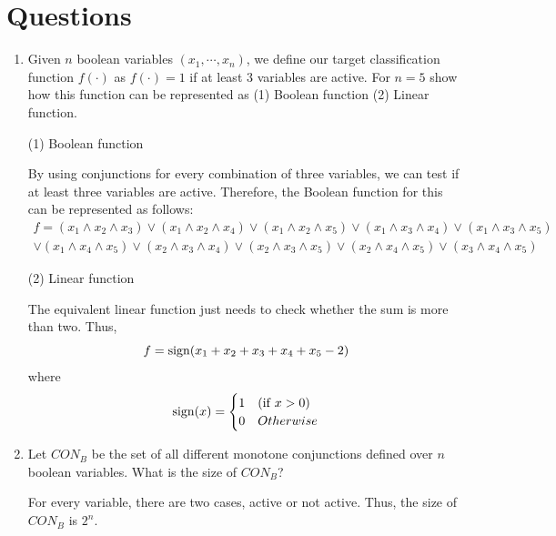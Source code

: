 

\oddsidemargin 0in
\evensidemargin 0in
\textwidth 6.5in
\topmargin -0.5in
\textheight 9.0in




\pagestyle{myheadings}  %

\section{Questions}

\begin{enumerate}
\item Given $n$ boolean variables $(x_1,\cdots,x_n)$, we define our target classification function $f(\cdot)$ as $f(\cdot)=1$ if at least 3 variables are active. For $n=5$ show how this function can be represented as (1) Boolean function (2) Linear function.

(1) Boolean function

By using conjunctions for every combination of three variables, we can test if at least three variables are active. Therefore, the Boolean function for this can be represented as follows:
\begin{eqnarray*}
f=(x_1 \wedge x_2 \wedge x_3) \vee (x_1 \wedge x_2 \wedge x_4) \vee (x_1 \wedge x_2 \wedge x_5) \vee (x_1 \wedge x_3 \wedge x_4) \vee (x_1 \wedge x_3 \wedge x_5) \\
\vee (x_1 \wedge x_4 \wedge x_5) \vee (x_2 \wedge x_3 \wedge x_4) \vee (x_2 \wedge x_3 \wedge x_5) \vee (x_2 \wedge x_4 \wedge x_5) \vee (x_3 \wedge x_4 \wedge x_5)
\end{eqnarray*}

(2) Linear function

The equivalent linear function just needs to check whether the sum is more than two. Thus,
\[
f = {\rm sign}(x_1 + x_2 + x_3 + x_4 + x_5 - 2)
\]
where
\[
{\rm sign}(x) = \begin{cases}
1 & ({\rm if} \; x > 0) \\
0 & Otherwise
\end{cases}
\]


\item Let $CON_B$ be the set of all different monotone conjunctions defined over $n$ boolean variables. What is the size of $CON_B$?

For every variable, there are two cases, active or not active. Thus, the size of $CON_B$ is $2^n$. 


\end{enumerate}

